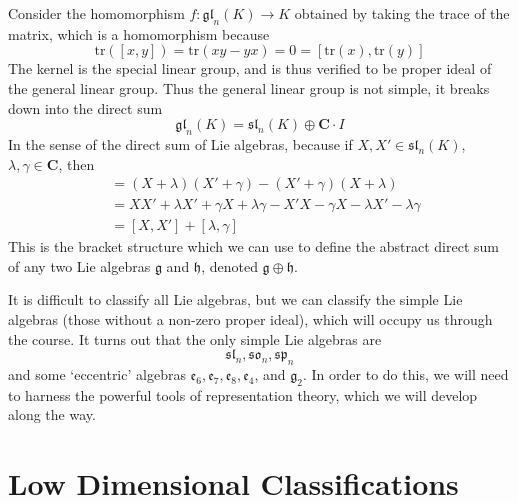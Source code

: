 \begin{example}
    Consider the homomorphism $f: \mathfrak{gl}_n(K) \to K$ obtained by taking the trace of the matrix, which is a homomorphism because
    \[ \text{tr}([x,y]) = \text{tr}(xy - yx) = 0 = [\text{tr}(x), \text{tr}(y)] \]
    The kernel is the special linear group, and is thus verified to be proper ideal of the general linear group. Thus the general linear group is not simple, it breaks down into the direct sum
    \[ \mathfrak{gl}_n(K) = \mathfrak{sl}_n(K) \oplus \mathbf{C} \cdot I \]
    In the sense of the direct sum of Lie algebras, because if $X,X' \in \mathfrak{sl}_n(K)$, $\lambda, \gamma \in \mathbf{C}$, then
    \begin{align*}
        [X + \lambda, X' + \gamma] &= (X + \lambda)(X' + \gamma) - (X' + \gamma)(X + \lambda)\\
        &= XX' + \lambda X' + \gamma X + \lambda \gamma - X'X - \gamma X - \lambda X' - \lambda \gamma\\
        &= [X,X'] + [\lambda, \gamma]
    \end{align*}
    This is the bracket structure which we can use to define the abstract direct sum of any two Lie algebras $\mathfrak{g}$ and $\mathfrak{h}$, denoted $\mathfrak{g} \oplus \mathfrak{h}$.
\end{example}

It is difficult to classify all Lie algebras, but we can classify the simple Lie algebras (those without a non-zero proper ideal), which will occupy us through the course. It turns out that the only simple Lie algebras are
%
\[ \mathfrak{sl}_n, \mathfrak{so}_n, \mathfrak{sp}_n \]
%
and some `eccentric' algebras $\mathfrak{e}_6, \mathfrak{e}_7, \mathfrak{e}_8, \mathfrak{e}_4$, and $\mathfrak{g}_2$. In order to do this, we will need to harness the powerful tools of representation theory, which we will develop along the way.

\section{Low Dimensional Classifications}

